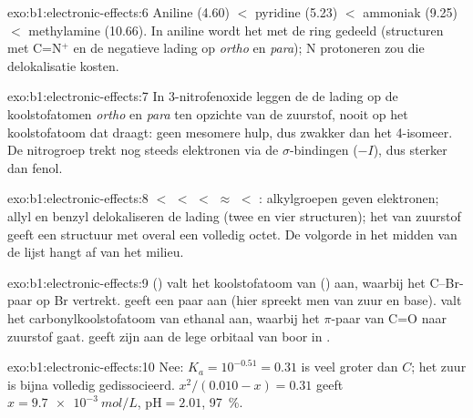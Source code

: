 \begin{solution}{exo:b1:electronic-effects:6}
Aniline (4.60) $<$ pyridine (5.23) $<$ ammoniak (9.25) $<$ methylamine
(10.66). In aniline wordt het  met de ring gedeeld (structuren
met C=N$^+$ en de negatieve lading op \textit{ortho} en
\textit{para}); N protoneren zou die delokalisatie kosten.
\end{solution}

\begin{solution}{exo:b1:electronic-effects:7}
In 3-nitrofenoxide leggen de  de lading op de
koolstofatomen \textit{ortho} en \textit{para} ten opzichte van de
zuurstof, nooit op het koolstofatoom dat  draagt: geen mesomere
hulp, dus zwakker dan het 4-isomeer. De nitrogroep trekt nog steeds
elektronen via de $\sigma$-bindingen ($-I$), dus sterker dan fenol.
\end{solution}

\begin{solution}{exo:b1:electronic-effects:8}
 $<$  $<$  $<$ 
$\approx$  $<$ : alkylgroepen geven elektronen;
allyl en benzyl delokaliseren de lading (twee en vier structuren); het
 van zuurstof geeft een structuur met overal een volledig
octet. De volgorde in het midden van de lijst hangt af van het milieu.
\end{solution}

\begin{solution}{exo:b1:electronic-effects:9}
 () valt het koolstofatoom van  ()
aan, waarbij het C--Br-paar op Br vertrekt.  geeft een paar aan
 (hier spreekt men van zuur en base).  valt het
carbonylkoolstofatoom van ethanal aan, waarbij het $\pi$-paar van C=O naar
zuurstof gaat.  geeft zijn  aan de lege orbitaal van
boor in .
\end{solution}

\begin{solution}{exo:b1:electronic-effects:10}
Nee: $K_a = 10^{-0.51} = 0.31$ is veel groter dan $C$; het zuur is bijna
volledig gedissocieerd. $x^2/(0.010 - x) = 0.31$ geeft
$x = \qty{9.7e-3}{mol/L}$, $\mathrm{pH} = 2.01$, 
\qty{97}{\percent}.
\end{solution}

